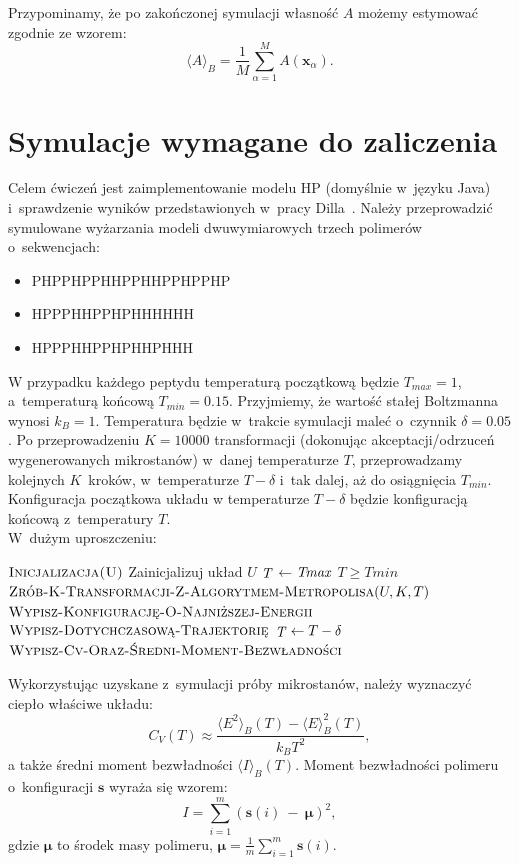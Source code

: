 \documentclass[a4paper,11pt,twoside]{book}
\begin{document}
Przypominamy, że po zakończonej symulacji własność $A$ możemy estymować zgodnie ze wzorem:
\begin{displaymath}
\langle A \rangle_B = \frac{1}{M}\sum_{\alpha=1}^M A(\mathbf{x}_{\alpha}).
\end{displaymath}
\section{Symulacje wymagane do zaliczenia}
Celem ćwiczeń jest zaimplementowanie modelu HP (domyślnie w~języku Java) i~sprawdzenie wyników przedstawionych w~pracy Dilla~\cite{dill}. Należy przeprowadzić symulowane wyżarzania modeli dwuwymiarowych trzech polimerów o~sekwencjach:
\begin{itemize}
\item PHPPHPPHHPPHHPPHPPHP
\item HPPPHHPPHPHHHHHH
\item HPPPHHPPHPHHPHHH
\end{itemize}
W przypadku każdego peptydu temperaturą początkową będzie $T_{max} = 1$, a~temperaturą końcową $T_{min} = 0.15$. Przyjmiemy, że wartość stałej Boltzmanna wynosi $k_B=1$. Temperatura będzie w~trakcie symulacji maleć o~czynnik $\delta = 0.05$. Po przeprowadzeniu $K = 10000$ transformacji (dokonując akceptacji/odrzuceń wygenerowanych mikrostanów) w~danej temperaturze $T$, przeprowadzamy kolejnych $K$~kroków, w~temperaturze $T-\delta$ i~tak dalej, aż do osiągnięcia $T_{min}$. Konfiguracja początkowa układu w temperaturze $T-\delta$ będzie konfiguracją końcową z~temperatury $T$.\\W~dużym uproszczeniu:
\begin{codebox}
	\li $\textnormal{\scshape Inicjalizacja(U)}$
	\li \Comment Zainicjalizuj układ $U$
	\li $\id{T}$$\gets$$\id{Tmax}$
	\li \While $T \geq Tmin$
	\li \Do
		\li $\textnormal{\scshape Zrób-K-Transformacji-Z-Algorytmem-Metropolisa}(U,K,T)$
		\li $\textnormal{\scshape Wypisz-Konfigurację-O-Najniższej-Energii}$
		\li $\textnormal{\scshape Wypisz-Dotychczasową-Trajektorię}$
		\li $\id{T}\gets T-\delta$
	\End
	\li $\textnormal{\scshape Wypisz-Cv-Oraz-Średni-Moment-Bezwładności}$
\End
\end{codebox}

Wykorzystując uzyskane z~symulacji próby mikrostanów, należy wyznaczyć ciepło właściwe układu:
\begin{displaymath}
C_V(T) \approx \frac{\langle E^2 \rangle_B(T)-\langle E \rangle^2_B(T)}{k_B T^2},
\end{displaymath}
a także średni moment bezwładności $\langle I \rangle_B(T)$. Moment bezwładności polimeru o~konfiguracji $\mathbf{s}$ wyraża się wzorem:
\begin{displaymath}
I = \sum_{i=1}^m (\mathbf{s}(i)~-~\pmb{\mu})^2,
\end{displaymath}
gdzie $\pmb{\mu}$ to środek masy polimeru, $\pmb{\mu}=\frac{1}{m} \sum_{i=1}^m\mathbf{s}(i)$. 
\end{document}
